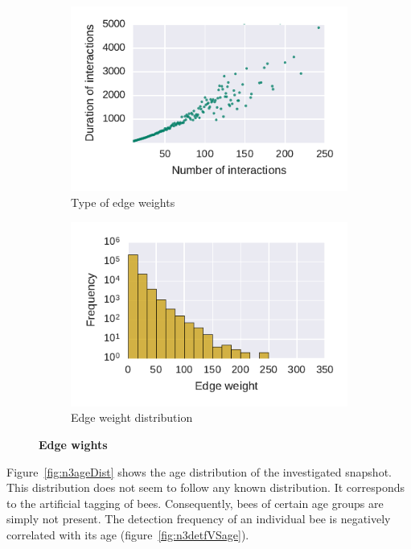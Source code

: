 \begin{figure}[htb]
	\centering
	\begin{subfigure}[b]{0.49\textwidth}
	\centering
	\includegraphics[width=1.0\textwidth]{Figures/n3-freqVSduration}
	\caption[Type of edge weights]{Type of edge weights}
	\label{fig:fVSd}
	\end{subfigure} 
	\begin{subfigure}[b]{0.49\textwidth}
	\centering
	\includegraphics[width=1.0\textwidth]{Figures/n3-edgeWeightDist.pdf}
	\caption[Edge weight distribution]{Edge weight distribution}
	\label{fig:edgeWdist}
	\end{subfigure}
	\caption[Edge wights]{\textbf{Edge wights} }
	\label{fig:edges}
\end{figure}


Figure~\ref{fig:n3ageDist} shows the age distribution of the investigated snapshot. This distribution does not seem to follow any known distribution. It corresponds to the artificial tagging of bees. Consequently, bees of certain age groups are simply not present. The detection frequency of an individual bee is negatively correlated with its age (figure~\ref{fig:n3detfVSage}).


